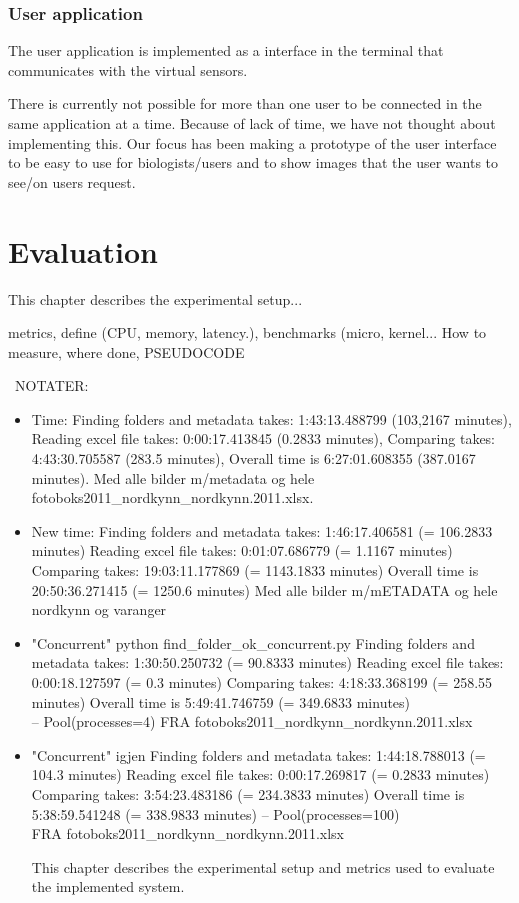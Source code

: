 \documentclass[USenglish]{uit-thesis}
\begin{document}
\subsection{User application} \label{ssec:user}
The user application is implemented as a interface in the terminal that communicates with the virtual sensors.

There is currently not possible for more than one user to be connected in the same application at a time. Because of lack of time, we have not thought about implementing this. Our focus has been making a prototype of the user interface to be easy to use for biologists/users and to show images that the user wants to see/on users request.


\chapter{Evaluation} 
This chapter describes the experimental setup...

metrics, define (CPU, memory, latency.), benchmarks (micro, kernel...
How to measure, where done, PSEUDOCODE

\ NOTATER:

\begin{itemize}

\item Time: Finding folders and metadata takes:  1:43:13.488799 (103,2167 minutes),
Reading excel file takes:  0:00:17.413845 (0.2833 minutes),
Comparing takes:  4:43:30.705587 (283.5 minutes),
Overall time is  6:27:01.608355 (387.0167 minutes).
Med alle bilder m/metadata og hele fotoboks2011\_nordkynn\_nordkynn.2011.xlsx.

\item New time: Finding folders and metadata takes:  1:46:17.406581 (= 106.2833 minutes)
Reading excel file takes:  0:01:07.686779 (= 1.1167 minutes)
Comparing takes:  19:03:11.177869 (= 1143.1833 minutes)
Overall time is  20:50:36.271415 (= 1250.6 minutes)
Med alle bilder m/mETADATA og hele nordkynn og varanger

\item "Concurrent" python find\_folder\_ok\_concurrent.py 
Finding folders and metadata takes:  1:30:50.250732 (= 90.8333 minutes)
Reading excel file takes:  0:00:18.127597 (= 0.3 minutes)
Comparing takes:  4:18:33.368199 (= 258.55 minutes)
Overall time is  5:49:41.746759 (= 349.6833 minutes)
\\ -- Pool(processes=4)
FRA fotoboks2011\_nordkynn\_nordkynn.2011.xlsx

\item "Concurrent" igjen
Finding folders and metadata takes:  1:44:18.788013 (= 104.3 minutes)
Reading excel file takes:  0:00:17.269817 (= 0.2833 minutes)
Comparing takes:  3:54:23.483186 (= 234.3833 minutes)
Overall time is  5:38:59.541248 (= 338.9833 minutes)
-- Pool(processes=100)
\\ FRA fotoboks2011\_nordkynn\_nordkynn.2011.xlsx

This chapter describes the experimental setup and metrics used to evaluate the implemented system. 

\end{itemize}
\end{document}

